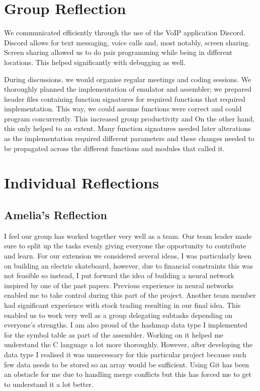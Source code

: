 \documentclass[11pt]{article}
\begin{document}
\section{Group Reflection}
We communicated efficiently through the use of the VoIP application Discord. 
Discord allows for text messaging, voice calls and, most notably, screen sharing.
Screen sharing allowed us to do pair programming while being in different locations. This helped significantly with debugging as well. 

During discussions, we would organise regular meetings and coding sessions. We thoroughly planned the implementation of emulator and assembler; we prepared header files containing function signatures
for required functions that required implementation. This way, we could assume functions were correct and could program concurrently.
This increased group productivity and 
On the other hand, this only helped to an extent. Many function signatures needed later alterations as the implementation required different parameters and these changes needed to be propagated across the different functions and modules that called it.

\section{Individual Reflections}
\subsection{Amelia's Reflection}
I feel our group has worked together very well as a team. Our team leader made sure to split up the tasks evenly giving everyone the opportunity to contribute and learn. For our extension we considered several ideas, I was particularly keen on building an electric skateboard, however, due to financial constraints this was not feasible so instead, I put forward the idea of building a neural network inspired by one of the past papers. Previous experience in neural networks enabled me to take control during this part of the project. Another team member had significant experience with stock trading resulting in our final idea. This enabled us to work very well as a group delegating subtasks depending on everyone's strengths. I am also proud of the hashmap data type I implemented for the symbol table as part of the assembler. Working on it helped me understand the C language a lot more thoroughly. However, after developing the data type I realised it was unnecessary for this particular project because such few data needs to be stored so an array would be sufficient. Using Git has been an obstacle for me due to handling merge conflicts but this has forced me to get to understand it a lot better.
\end{document}
